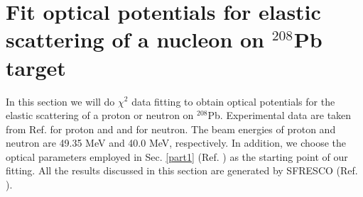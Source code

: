 \section{Fit optical potentials for elastic scattering of a nucleon on $^{208}$Pb target}
In this section we will do $\chi^2$ data fitting to obtain optical potentials 
for the elastic scattering of a proton or neutron on $^{208}$Pb. 
Experimental data are taken from Ref. \cite{MANI1971384_ProtonPb208Data} for proton and 
and \cite{PhysRevC.85.024619_NeutronPb208Data} for neutron. 
The beam energies of proton and neutron are 49.35 MeV and 40.0 MeV, respectively. 
In addition, we choose the optical parameters employed in Sec. \ref{part1} (Ref. \cite{capote2009ripl,koning2003local}) 
as the starting point of our fitting. 
All the results discussed in this section are generated by SFRESCO (Ref. \cite{FRESCO}). 

